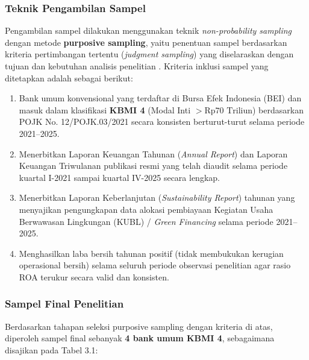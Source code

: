 \documentclass[12pt,a4paper]{article}
\numberwithin{equation}{section}
\begin{document}
\subsubsection{Teknik Pengambilan Sampel}
\noindent
Pengambilan sampel dilakukan menggunakan teknik \emph{non-probability sampling} dengan metode \textbf{purposive sampling}, yaitu penentuan sampel berdasarkan kriteria pertimbangan tertentu (\emph{judgment sampling}) yang diselaraskan dengan tujuan dan kebutuhan analisis penelitian \citep{Sugiyono2019}. Kriteria inklusi sampel yang ditetapkan adalah sebagai berikut:
\begin{enumerate}
  \item Bank umum konvensional yang terdaftar di Bursa Efek Indonesia (BEI) dan masuk dalam klasifikasi \textbf{KBMI 4} (Modal Inti $> \text{Rp}70 \text{ Triliun}$) berdasarkan POJK No. 12/POJK.03/2021 secara konsisten berturut-turut selama periode 2021--2025.
  \item Menerbitkan Laporan Keuangan Tahunan (\emph{Annual Report}) dan Laporan Keuangan Triwulanan publikasi resmi yang telah diaudit selama periode kuartal I-2021 sampai kuartal IV-2025 secara lengkap.
  \item Menerbitkan Laporan Keberlanjutan (\emph{Sustainability Report}) tahunan yang menyajikan pengungkapan data alokasi pembiayaan Kegiatan Usaha Berwawasan Lingkungan (KUBL) / \emph{Green Financing} selama periode 2021--2025.
  \item Menghasilkan laba bersih tahunan positif (tidak membukukan kerugian operasional bersih) selama seluruh periode observasi penelitian agar rasio ROA terukur secara valid dan konsisten.
\end{enumerate}

\subsubsection{Sampel Final Penelitian}
\noindent
Berdasarkan tahapan seleksi purposive sampling dengan kriteria di atas, diperoleh sampel final sebanyak \textbf{4 bank umum KBMI 4}, sebagaimana disajikan pada Tabel 3.1:
\end{document}
